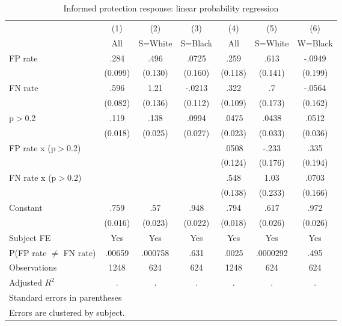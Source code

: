 \begin{table}[htbp]\centering
\caption{Informed protection response: linear probability regression}
\begin{tabular}{l*{6}{c}}
\hline\hline
                &\multicolumn{1}{c}{(1)}&\multicolumn{1}{c}{(2)}&\multicolumn{1}{c}{(3)}&\multicolumn{1}{c}{(4)}&\multicolumn{1}{c}{(5)}&\multicolumn{1}{c}{(6)}\\
                &\multicolumn{1}{c}{All}&\multicolumn{1}{c}{S=White}&\multicolumn{1}{c}{S=Black}&\multicolumn{1}{c}{All}&\multicolumn{1}{c}{S=White}&\multicolumn{1}{c}{W=Black}\\
\hline
FP rate         &     .284&     .496&    .0725&     .259&     .613&   -.0949\\
                &  (0.099)&  (0.130)&  (0.160)&  (0.118)&  (0.141)&  (0.199)\\
FN rate         &     .596&     1.21&   -.0213&     .322&       .7&   -.0564\\
                &  (0.082)&  (0.136)&  (0.112)&  (0.109)&  (0.173)&  (0.162)\\
p$>$0.2         &     .119&     .138&    .0994&    .0475&    .0438&    .0512\\
                &  (0.018)&  (0.025)&  (0.027)&  (0.023)&  (0.033)&  (0.036)\\
FP rate x (p$>$0.2)&         &         &         &    .0508&    -.233&     .335\\
                &         &         &         &  (0.124)&  (0.176)&  (0.194)\\
FN rate x (p$>$0.2)&         &         &         &     .548&     1.03&    .0703\\
                &         &         &         &  (0.138)&  (0.233)&  (0.166)\\
Constant        &     .759&      .57&     .948&     .794&     .617&     .972\\
                &  (0.016)&  (0.023)&  (0.022)&  (0.018)&  (0.026)&  (0.026)\\
Subject FE      &      Yes&      Yes&      Yes&      Yes&      Yes&      Yes\\
\hline
P(FP rate $\neq$ FN rate)&   .00659&  .000758&     .631&    .0025& .0000292&     .495\\
Observations    &     1248&      624&      624&     1248&      624&      624\\
Adjusted \(R^{2}\)&        .&        .&        .&        .&        .&        .\\
\hline\hline
\multicolumn{7}{l}{\footnotesize Standard errors in parentheses}\\
\multicolumn{7}{l}{\footnotesize Errors are clustered by subject.}\\
\end{tabular}
\end{table}

